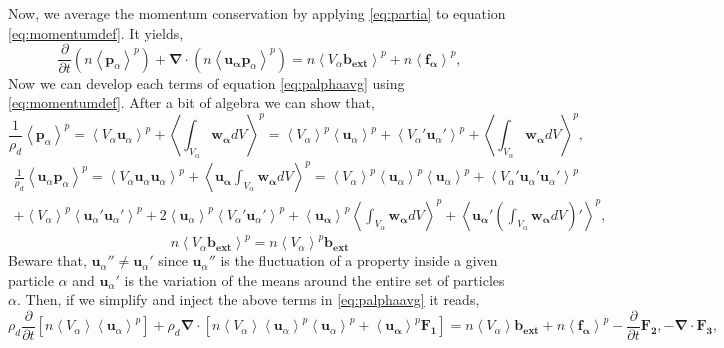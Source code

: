 Now, we average the momentum conservation by applying \ref{eq:partia} to equation \ref{eq:momentumdef}. 
It yields,
\begin{equation}
    \frac{\partial }{\partial t}(n\left<\bm{p}_\alpha\right>^p) 
    + \bm{\nabla}\cdot(n\left<\bm{u_\alpha}\bm{p}_\alpha\right>^p)
    = n \left<V_\alpha\bm{b_{ext}}\right>^p 
    + n\left<\bm{f_\alpha}\right>^p,
    \label{eq:palphaavg}
\end{equation}  
Now we can develop each terms of equation \ref{eq:palphaavg} using \ref{eq:momentumdef}. 
After a bit of algebra we can show that,
\begin{equation*}
    \frac{1}{\rho_d}\left<\bm{p}_\alpha\right>^p 
    = \left<V_\alpha \bm{u}_\alpha\right>^p
    + \left<\int_{V_\alpha} \bm{w_\alpha}dV\right>^p 
    = \left<V_\alpha\right>^p \left<\bm{u}_\alpha\right>^p
    + \left<V_\alpha' \bm{u}_\alpha'\right>^p
    + \left<\int_{V_\alpha} \bm{w_\alpha}dV\right>^p,
\end{equation*}
\begin{multline*}
    \frac{1}{\rho_d}\left<\bm{u}_\alpha\bm{p}_\alpha\right>^p 
    = \left<V_\alpha \bm{u}_\alpha\bm{u}_\alpha\right>^p
    + \left<\bm{u_\alpha}\int_{V_\alpha} \bm{w_\alpha}dV\right>^p 
    = \left<V_\alpha\right>^p \left<\bm{u}_\alpha\right>^p \left<\bm{u}_\alpha\right>^p
    + \left<V_\alpha' \bm{u}_\alpha'\bm{u}_\alpha'\right>^p\\
    + \left<V_\alpha\right>^p \left<\bm{u}_\alpha'\bm{u}_\alpha'\right>^p
    + 2 \left<\bm{u}_\alpha\right>^p \left<V_\alpha'\bm{u}_\alpha'\right>^p
    + \left<\bm{u_\alpha}\right>^p\left<\int_{V_\alpha} \bm{w_\alpha}dV\right>^p
    + \left<\bm{u_\alpha}'\left(\int_{V_\alpha} \bm{w_\alpha}dV\right)'\right>^p,
\end{multline*}
\begin{equation*}
    n \left<V_\alpha\bm{b_{ext}}\right>^p 
    = n \left<V_\alpha\right>^p\bm{b_{ext}}
\end{equation*}
Beware that, $ \bm{u}_\alpha'' \neq \bm{u}_\alpha'$ since $\bm{u}_\alpha''$ is the fluctuation of a property inside a given particle $\alpha$ and $\bm{u}_\alpha'$ is the variation of the means around the entire set of particles $\alpha$. 
Then, if we simplify and inject the above terms in \ref{eq:palphaavg} it reads,
\begin{equation}
    \rho_d 
    \frac{\partial }{\partial t}
    \left[
        n\left<V_\alpha\right> \left<\bm{u}_\alpha\right>^p
    \right] 
    + \rho_d\bm{\nabla}\cdot
    \left[
        n\left<V_\alpha\right> \left<\bm{u}_\alpha\right>^p \left<\bm{u}_\alpha\right>^p
    + \left<\bm{u_\alpha}\right>^p \bm{F_1}
    \right]
    = n\left<V_\alpha\right>\bm{b_{ext}} 
    + n\left<\bm{f_\alpha}\right>^p
    - \frac{\partial }{\partial t}\bm{F_2},
    - \bm{\nabla}\cdot\bm{F_3},
    \label{eq:particlesAVG}
\end{equation} 
